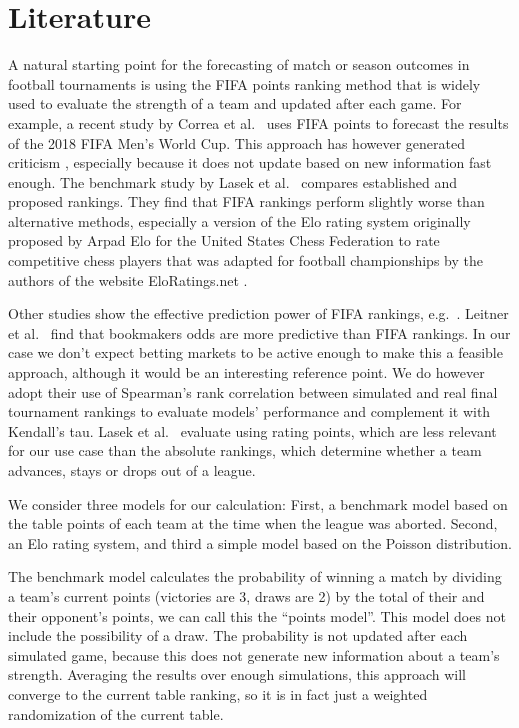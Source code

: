\documentclass[12pt,a4paper]{article}
\begin{document}
\hypertarget{literature}{%
\section{Literature}\label{literature}}

A natural starting point for the forecasting of match or season outcomes
in football tournaments is using the FIFA points ranking method that is
widely used to evaluate the strength of a team and updated after each
game. For example, a recent study by Correa et al.~\autocite*{correa}
uses FIFA points to forecast the results of the 2018 FIFA Men's World
Cup. This approach has however generated criticism
\textcite{mchale2007}, especially because it does not update based on
new information fast enough. The benchmark study by Lasek et
al.~\autocite*{lasek2013} compares established and proposed rankings.
They find that FIFA rankings perform slightly worse than alternative
methods, especially a version of the Elo rating system originally
proposed by Arpad Elo for the United States Chess Federation to rate
competitive chess players that was adapted for football championships by
the authors of the website EloRatings.net \autocite*{eloratings}.

Other studies show the effective prediction power of FIFA rankings,
e.g.~\textcite{suzuki2008}. Leitner et al.~\autocite*{leitner2010} find
that bookmakers odds are more predictive than FIFA rankings. In our case
we don't expect betting markets to be active enough to make this a
feasible approach, although it would be an interesting reference point.
We do however adopt their use of Spearman's rank correlation between
simulated and real final tournament rankings to evaluate models'
performance and complement it with Kendall's tau. Lasek et
al.~\autocite*{lasek2013} evaluate using rating points, which are less
relevant for our use case than the absolute rankings, which determine
whether a team advances, stays or drops out of a league.

We consider three models for our calculation: First, a benchmark model
based on the table points of each team at the time when the league was
aborted. Second, an Elo rating system, and third a simple model based on
the Poisson distribution.

The benchmark model calculates the probability of winning a match by
dividing a team's current points (victories are 3, draws are 2) by the
total of their and their opponent's points, we can call this the
\enquote{points model}. This model does not include the possibility of a
draw. The probability is not updated after each simulated game, because
this does not generate new information about a team's strength.
Averaging the results over enough simulations, this approach will
converge to the current table ranking, so it is in fact just a weighted
randomization of the current table.
\end{document}

